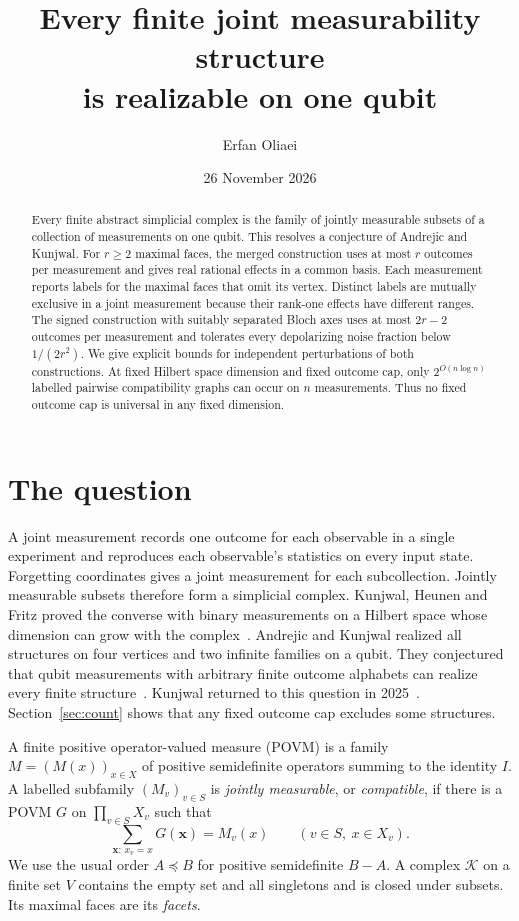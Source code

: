 \documentclass[11pt,a4paper]{article}
\title{\bfseries Every finite joint measurability structure\\ is realizable on one qubit}
\author{Erfan Oliaei}
\date{26 November 2026}
\theoremstyle{definition}
\newcommand{\Id}{I}
\newcommand{\K}{\mathcal K}
\begin{document}
\maketitle
\begin{abstract}
Every finite abstract simplicial complex is the family of jointly measurable
subsets of a collection of measurements on one qubit. This resolves a
conjecture of Andrejic and Kunjwal. For \(r\ge2\) maximal faces, the merged
construction uses at most \(r\) outcomes per measurement and gives real
rational effects in a common basis. Each measurement reports labels for
the maximal faces that omit its vertex. Distinct labels are mutually
exclusive in a joint measurement because their rank-one effects have
different ranges. The signed construction with suitably separated Bloch
axes uses at most \(2r-2\) outcomes per measurement and tolerates every
depolarizing noise fraction below \(1/(2r^2)\). We give explicit
bounds for independent perturbations of both constructions. At fixed
Hilbert space dimension and fixed outcome cap, only \(2^{O(n\log n)}\)
labelled pairwise compatibility graphs can occur on \(n\) measurements.
Thus no fixed outcome cap is universal in any fixed dimension.
\end{abstract}

\section{The question}
A joint measurement records one outcome for each observable in a single
experiment and reproduces each observable's statistics on every input state. Forgetting
coordinates gives a joint measurement for each subcollection. Jointly measurable subsets therefore form a simplicial
complex. Kunjwal, Heunen and Fritz proved the converse with binary
measurements on a Hilbert space whose dimension can grow with the
complex~\cite{KHF}. Andrejic and Kunjwal realized all structures on four
vertices and two infinite families on a qubit. They conjectured that
qubit measurements with arbitrary finite outcome alphabets can realize
every finite structure~\cite[Conjecture~4]{AK}. Kunjwal returned to this
question in 2025~\cite[Sec.~5.3]{HDR}. Section~\ref{sec:count} shows that
any fixed outcome cap excludes some structures.

A finite positive operator-valued measure (POVM) is a family \(M=(M(x))_{x\in X}\) of
positive semidefinite operators summing to the identity \(\Id\).
A labelled subfamily \((M_v)_{v\in S}\) is \emph{jointly measurable}, or
\emph{compatible}, if there is a POVM \(G\) on \(\prod_{v\in S}X_v\) such that
\[
     \sum_{\boldsymbol x:\,x_v=x}G(\boldsymbol x)=M_v(x)
     \qquad (v\in S,\ x\in X_v).
\]
We use the usual order \(A\preceq B\) for positive semidefinite \(B-A\).
A complex \(\K\) on a finite set \(V\) contains the empty set and all
singletons and is closed under subsets. Its maximal faces are its
\emph{facets}.
\end{document}
